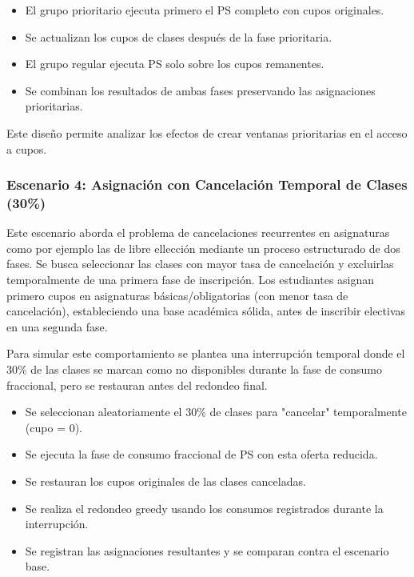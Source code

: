 \documentclass{article}
\begin{document}
\begin{itemize}
\item El grupo prioritario ejecuta primero el PS completo con cupos originales.
\item Se actualizan los cupos de clases después de la fase prioritaria.
\item El grupo regular ejecuta PS solo sobre los cupos remanentes.
\item Se combinan los resultados de ambas fases preservando las asignaciones prioritarias.
\end{itemize}

Este diseño permite analizar los efectos de crear ventanas prioritarias en el acceso a cupos.

\subsubsection{Escenario 4: Asignación con Cancelación Temporal de Clases (30\%)}

Este escenario aborda el problema de cancelaciones recurrentes en asignaturas como por ejemplo las de libre ellección
 mediante un proceso estructurado de dos fases. Se busca seleccionar las clases con mayor tasa de cancelación
  y excluirlas temporalmente de una primera fase de inscripción. Los estudiantes asignan primero cupos en asignaturas básicas/obligatorias
   (con menor tasa de cancelación),
  estableciendo una base académica sólida, antes de inscribir electivas en una segunda fase. 

Para simular este comportamiento se plantea una interrupción temporal donde el 30\% de las clases se marcan 
como no disponibles durante la fase de consumo fraccional, 
pero se restauran antes del redondeo final. 

\begin{itemize}
\item Se seleccionan aleatoriamente el 30\% de clases para "cancelar" temporalmente (cupo = 0).
\item Se ejecuta la fase de consumo fraccional de PS con esta oferta reducida.
\item Se restauran los cupos originales de las clases canceladas.
\item Se realiza el redondeo greedy usando los consumos registrados durante la interrupción.
\item Se registran las asignaciones resultantes y se comparan contra el escenario base.
\end{itemize}
\end{document}
